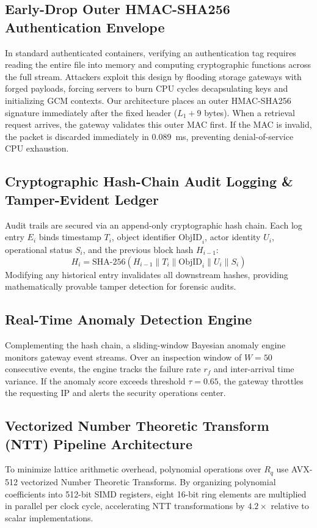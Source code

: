 \documentclass[sn-mathphys,Numbered]{sn-jnl}%
\theoremstyle{thmstyleone}%
\theoremstyle{thmstyletwo}%
\theoremstyle{thmstylethree}%
\begin{document}
\subsection{\textbf{Early-Drop Outer HMAC-SHA256 Authentication Envelope}}
In standard authenticated containers, verifying an authentication tag requires reading the entire file into memory and computing cryptographic functions across the full stream. Attackers exploit this design by flooding storage gateways with forged payloads, forcing servers to burn CPU cycles decapsulating keys and initializing GCM contexts. Our architecture places an outer HMAC-SHA256 signature immediately after the fixed header ($L_1 + 9$ bytes). When a retrieval request arrives, the gateway validates this outer MAC first. If the MAC is invalid, the packet is discarded immediately in $0.089$~ms, preventing denial-of-service CPU exhaustion.

\subsection{\textbf{Cryptographic Hash-Chain Audit Logging \& Tamper-Evident Ledger}}
Audit trails are secured via an append-only cryptographic hash chain. Each log entry $E_i$ binds timestamp $T_i$, object identifier $\text{ObjID}_i$, actor identity $U_i$, operational status $S_i$, and the previous block hash $H_{i-1}$:
\begin{equation}
H_i = \text{SHA-256}(H_{i-1} \parallel T_i \parallel \text{ObjID}_i \parallel U_i \parallel S_i)
\end{equation}
Modifying any historical entry invalidates all downstream hashes, providing mathematically provable tamper detection for forensic audits.

\subsection{\textbf{Real-Time Anomaly Detection Engine}}
Complementing the hash chain, a sliding-window Bayesian anomaly engine monitors gateway event streams. Over an inspection window of $W = 50$ consecutive events, the engine tracks the failure rate $r_f$ and inter-arrival time variance. If the anomaly score exceeds threshold $\tau = 0.65$, the gateway throttles the requesting IP and alerts the security operations center.

\subsection{\textbf{Vectorized Number Theoretic Transform (NTT) Pipeline Architecture}}
To minimize lattice arithmetic overhead, polynomial operations over $R_q$ use AVX-512 vectorized Number Theoretic Transforms. By organizing polynomial coefficients into 512-bit SIMD registers, eight 16-bit ring elements are multiplied in parallel per clock cycle, accelerating NTT transformations by $4.2\times$ relative to scalar implementations.
\end{document}
